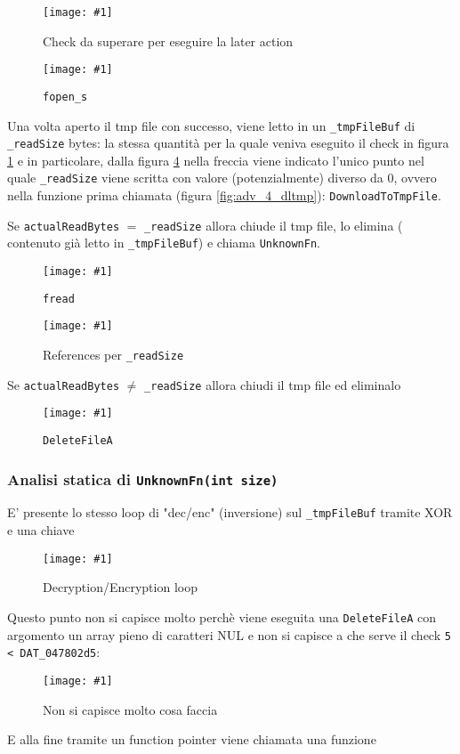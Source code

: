 \documentclass[
    a4paper, %
    11pt %
]{article}
\newcommand{\pic}[4]{\begin{figure}[H]
            \centering
            \texttt{[image: \#1]}
            \caption{#2}
            \label{fig:#1}
            \end{figure}}
\begin{document}
            \pic{adv_4_later_init}{Check da superare per eseguire la later action}{14cm}{6cm}  

            \pic{adv_4_later_fopen}{\texttt{fopen\_s}}{14cm}{2cm}

            Una volta aperto il tmp file con successo, viene letto in un \texttt{\_tmpFileBuf} di 
            \texttt{\_readSize} bytes: la stessa quantità per la quale veniva eseguito il check in figura 
            \ref{fig:adv_4_later_init} e in particolare, dalla figura \ref{fig:adv_4_later_readsize} nella
            freccia viene indicato l'unico punto nel quale \texttt{\_readSize} viene scritta con valore
            (potenzialmente) diverso da 0, ovvero nella funzione prima chiamata (figura \ref{fig:adv_4_dltmp}): 
            \texttt{DownloadToTmpFile}.

            Se \texttt{actualReadBytes} $=$ \texttt{\_readSize} allora chiude il tmp file, lo elimina (
            contenuto già letto in \texttt{\_tmpFileBuf}) e chiama \texttt{UnknownFn}.
            
            \pic{adv_4_later_readok}{\texttt{fread}}{17cm}{5cm}

            \pic{adv_4_later_readsize}{References per \texttt{\_readSize}}{17cm}{7.5cm}

            Se \texttt{actualReadBytes} $\neq$ \texttt{\_readSize} allora chiudi il tmp file ed eliminalo
            
            \pic{adv_4_later_readfail}{\texttt{DeleteFileA}}{9.5cm}{3.5cm}

            \subsubsection{Analisi statica di \texttt{UnknownFn(int size)}}

            E' presente lo stesso loop di "dec/enc" (inversione) sul \texttt{\_tmpFileBuf} tramite XOR e una 
            chiave
            
            \pic{adv_4_later_unkfn_decrypt}{Decryption/Encryption loop}{17.5cm}{4cm}

            Questo punto non si capisce molto perchè viene eseguita una \texttt{DeleteFileA} con argomento
            un array pieno di caratteri NUL e non si capisce a che serve il check \texttt{5 < DAT\_047802d5}:
            
            \pic{adv_4_later_unkfn_unkact}{Non si capisce molto cosa faccia}{12cm}{10cm}

            E alla fine tramite un function pointer viene chiamata una funzione
            
\end{document}

